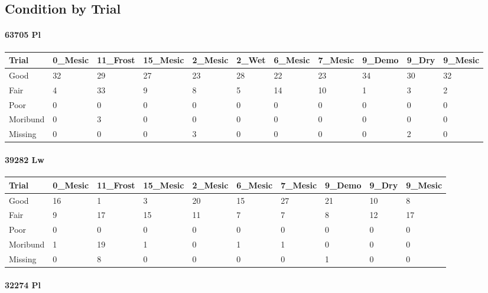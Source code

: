 \documentclass[
]{article}
\begin{document}
\hypertarget{condition-by-trial}{%
\subsection{Condition by Trial}\label{condition-by-trial}}

\hypertarget{pl-1}{%
\paragraph{63705 Pl}\label{pl-1}}

\begin{tabular}{l|l|l|l|l|l|l|l|l|l|l}
\hline
Trial & 0\_Mesic & 11\_Frost & 15\_Mesic & 2\_Mesic & 2\_Wet & 6\_Mesic & 7\_Mesic & 9\_Demo & 9\_Dry & 9\_Mesic\\
\hline
Good & 32 & 29 & 27 & 23 & 28 & 22 & 23 & 34 & 30 & 32\\
\hline
Fair & 4 & 33 & 9 & 8 & 5 & 14 & 10 & 1 & 3 & 2\\
\hline
Poor & 0 & 0 & 0 & 0 & 0 & 0 & 0 & 0 & 0 & 0\\
\hline
Moribund & 0 & 3 & 0 & 0 & 0 & 0 & 0 & 0 & 0 & 0\\
\hline
Missing & 0 & 0 & 0 & 3 & 0 & 0 & 0 & 0 & 2 & 0\\
\hline
\end{tabular}

\hypertarget{lw-1}{%
\paragraph{39282 Lw}\label{lw-1}}

\begin{tabular}{l|l|l|l|l|l|l|l|l|l}
\hline
Trial & 0\_Mesic & 11\_Frost & 15\_Mesic & 2\_Mesic & 6\_Mesic & 7\_Mesic & 9\_Demo & 9\_Dry & 9\_Mesic\\
\hline
Good & 16 & 1 & 3 & 20 & 15 & 27 & 21 & 10 & 8\\
\hline
Fair & 9 & 17 & 15 & 11 & 7 & 7 & 8 & 12 & 17\\
\hline
Poor & 0 & 0 & 0 & 0 & 0 & 0 & 0 & 0 & 0\\
\hline
Moribund & 1 & 19 & 1 & 0 & 1 & 1 & 0 & 0 & 0\\
\hline
Missing & 0 & 8 & 0 & 0 & 0 & 0 & 1 & 0 & 0\\
\hline
\end{tabular}

\hypertarget{pl-2}{%
\paragraph{32274 Pl}\label{pl-2}}
\end{document}
